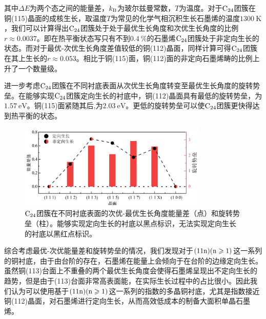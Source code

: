 其中$\Delta E$为两个态之间的能量差，$k_{\rm B}$为玻尔兹曼常数，$T$为温度。对于$\rm{C_{24}}$团簇在铜(115)晶面的成核生长，取温度$T$为常见的化学气相沉积生长石墨烯的温度$\SI{1300 }{\kelvin}$，我们可以计算得出$\rm{C_{24}}$团簇处于处于最优生长角度和次优生长角度的比例$r\approx 0.0037$。即在热平衡状态写只有不到$\SI{0.4}{\percent}$的石墨烯$\rm{C_{24}}$团簇处于非定向生长的状态。而对于最优-次优生长角度差值较低的铜(112)晶面，同样计算可得$\rm{C_{24}}$团簇在其上生长的$r\approx 0.053$。相比于铜(115)面，铜(112)面的非定向石墨烯畴的比例上升了一个数量级。

进一步考虑$\rm{C_{24}}$团簇在不同衬底表面从次优生长角度转变至最优生长角度的旋转势垒。在能够实现$\rm{C_{24}}$团簇定向生长的衬底中，铜(112)晶面具有最低的旋转势垒，为$\SI{1.57 }{\electronvolt}$。铜(115)面紧随其后,为$\SI{2.03 }{\electronvolt}$。更低的旋转势垒可以使$\rm{C_{24}}$团簇更快得达到热平衡的状态。

\begin{figure}[htb]
    \includegraphics[width=0.8\textwidth]{pic/GO_C24_energyDiff_barrier.png}
    \caption{$\rm{C_{24}}$团簇在不同衬底表面的次优-最优生长角度能量差（点）和旋转势垒（柱）。能够实现定向生长的衬底以黑点标识，无法实现定向生长的衬底以黑红点标识。}
    \label{fig:GO_C24_energyDiff_barrier}
\end{figure}

综合考虑最优-次优能量差和旋转势垒的情况，我们发现对于$\rm{(11n)(n \geqslant 1)}$这一系列的铜衬底，由于由台阶的存在，石墨烯在能量上会倾向于在台阶的边缘定向生长。虽然铜(113)台面上不重叠的两个最优生长角度会使得石墨烯呈现出不定向生长的趋势，但是由于(113)台面非常高表面能，在实际生长过程中的占比很小。因此我们认为可以使用基于$\rm{(11n)(n \geqslant 1)}$这一系列的指数的多晶铜衬底，尤其是指数接近铜(112)晶面，对石墨烯进行定向生长，从而高效低成本的制备大面积单晶石墨烯。

